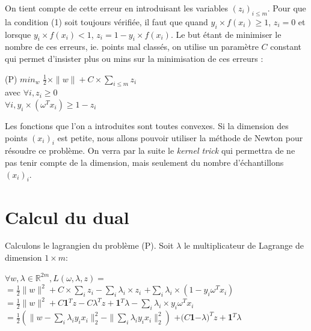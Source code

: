 \documentclass{article}
\begin{document}
On tient compte de cette erreur en introduisant les variables $(z_i)_{i \leq m}$. Pour que la condition (1) soit toujours vérifiée, il faut que quand $y_i \times f(x_i) \geq 1$, $z_i = 0$ et lorsque $y_i \times f(x_i) < 1$, $z_i = 1 - y_i \times f(x_i)$. Le but étant de minimiser le nombre de ces erreurs, ie. points mal classés, on utilise un paramètre $C$ constant qui permet d'insister plus ou mins sur la minimisation de ces erreurs :\\ 


           \begin{centre}
           (P) $min_{w}$ $\frac{1}{2} \times \|w\| + C \times \sum_{i \leq m}z_i$\\
           avec $\forall i, z_i \geq 0$\\
           $\forall i, y_i \times (\omega^{T} x_i) \geq 1 - z_i$\\
           \end{centre}

\bigskip

Les fonctions que l'on a introduites sont toutes convexes. Si la dimension des points $(x_i)_i$ est petite, nous allons pouvoir utiliser la méthode de Newton pour résoudre ce problème. On verra par la suite le \emph{kernel trick} qui permettra de ne pas tenir compte de la dimension, mais seulement du nombre d'échantillons $(x_i)_i$.

\section{Calcul du dual}

Calculons le lagrangien du problème (P). Soit $\lambda$ le multiplicateur de Lagrange de dimension $1 \times m$:

              \begin{center}
              $\forall w, \lambda \in \mathbb{R}^{2m}, L(\omega, \lambda, z) = $\\
              $= \frac{1}{2} \|w\|^2 + C \times \sum_i z_i - \sum_i \lambda_i \times z_i$
              $+ \sum_i \lambda_i \times (1 - y_i \omega^{T} x_i)$\\
              $= \frac{1}{2} \|w\|^2 + C$\textbf{1}$^{T}z - C\lambda^{T}z + $\textbf{1}$^{T}\lambda - \sum_i \lambda_i \times y_i \omega^{T} x_i$\\
              $= \frac{1}{2} (\|w - \sum_i \lambda_iy_ix_i\|^2_2 - \|\sum_i \lambda_iy_ix_i\|^2_2)$
              $+ (C$\textbf{1}$ - \lambda)^{T}z + $\textbf{1}$^{T}\lambda$\\
              \end{center}
\end{document}
